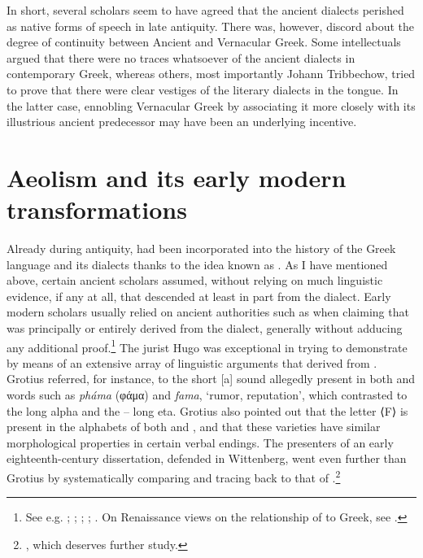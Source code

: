In short, several scholars seem to have agreed that the ancient dialects perished as native forms of speech in late antiquity. There was, however, discord about the degree of continuity between Ancient and Vernacular Greek. Some intellectuals argued that there were no traces whatsoever of the ancient dialects in contemporary Greek, whereas others, most importantly Johann Tribbechow, tried to prove that there were clear vestiges of the literary dialects in the  tongue. In the latter case, ennobling Vernacular Greek by associating it more closely with its illustrious ancient predecessor may have been an underlying incentive.

\section{Aeolism and its early modern transformations}\label{sec:5.6}

Already during antiquity,  had been incorporated into the history of the Greek language and its dialects thanks to the idea known as . As I have mentioned above, certain ancient scholars assumed, without relying on much linguistic evidence, if any at all, that  descended at least in part from the  dialect. Early modern scholars usually relied on ancient authorities such as  when claiming that  was principally or entirely derived from the  dialect, generally without adducing any additional proof.\footnote{See e.g. \citet[84]{Crinesius1629}; \citet[\textsc{xvii}]{Bentley1726}; \citet[76, 106]{Hemsterhuis2015}; \citet[30]{Munthe1748}; \citet[215--216]{Simonis1752}. On Renaissance views on the relationship of  to Greek, see \citet{Tavoni1986}.} The  jurist Hugo \citet[144--146]{Grotius1648} was exceptional in trying to demonstrate by means of an extensive array of linguistic arguments that  derived from . Grotius referred, for instance, to the short [a] sound allegedly present in both  and  words such as \textit{pháma} (φάμα) and \textit{fama}, ‘rumor, reputation’, which contrasted to the  long alpha and the – long eta. Grotius also pointed out that the letter  ⟨F⟩ is present in the alphabets of both  and , and that these varieties have similar morphological properties in certain verbal endings. The presenters of an early eighteenth-century dissertation, defended in Wittenberg, went even further than Grotius by systematically comparing and tracing back   to that of .\footnote{\citet{ThryllitschBrunner1709}, which deserves further study.}

